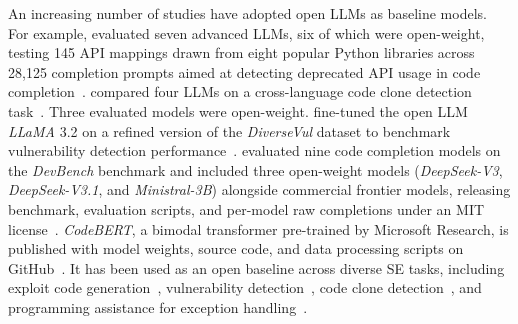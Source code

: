 An increasing number of studies have adopted open LLMs as baseline models.
For example, \citeauthor{DBLP:journals/corr/abs-2406-09834} evaluated seven advanced LLMs, six of which were open-weight, testing 145 API mappings drawn from eight popular Python libraries across 28,125 completion prompts aimed at detecting deprecated API usage in code completion~\cite{DBLP:journals/corr/abs-2406-09834}.
\citeauthor{DBLP:journals/corr/abs-2408-04430} compared four LLMs on a cross-language code clone detection task~\cite{DBLP:journals/corr/abs-2408-04430}.
Three evaluated models were open-weight.
\citeauthor{DBLP:conf/eicc/GoncalvesSC0MPS25} fine-tuned the open LLM \emph{LLaMA} 3.2 on a refined version of the \emph{DiverseVul} dataset to benchmark vulnerability detection performance~\cite{DBLP:conf/eicc/GoncalvesSC0MPS25}.
\citeauthor{DBLP:journals/corr/abs-2601-11895} evaluated nine code completion models on the \emph{DevBench} benchmark and included three open-weight models (\emph{DeepSeek-V3}, \emph{DeepSeek-V3.1}, and \emph{Ministral-3B}) alongside commercial frontier models, releasing benchmark, evaluation scripts, and per-model raw completions under an MIT license~\cite{DBLP:journals/corr/abs-2601-11895}.
\emph{CodeBERT}, a bimodal transformer pre-trained by Microsoft Research, is published with model weights, source code, and data processing scripts on GitHub~\cite{codebert}. It has been used as an open baseline across diverse SE tasks, including exploit code generation~\cite{DBLP:journals/jss/YangZCZHC23}, vulnerability detection~\cite{DBLP:conf/gaiis/XiaSD24}, code clone detection~\cite{DBLP:conf/kbse/SonnekalbGBM22}, and programming assistance for exception handling~\cite{DBLP:conf/icse/CaiYMMN24}.

